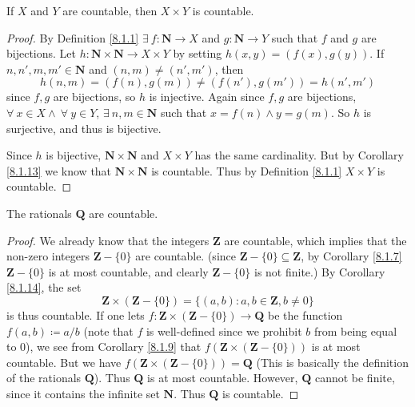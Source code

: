 \begin{corollary}\label{8.1.14}
    If \(X\) and \(Y\) are countable, then \(X \times Y\) is countable.
\end{corollary}

\begin{proof}
    By Definition \ref{8.1.1} \(\exists\ f : \mathbf{N} \to X\) and \(g : \mathbf{N} \to Y\) such that \(f\) and \(g\) are bijections.
    Let \(h : \mathbf{N} \times \mathbf{N} \to X \times Y\) by setting \(h(x, y) = (f(x), g(y))\).
    If \(n, n', m, m' \in \mathbf{N}\) and \((n, m) \neq (n', m')\), then
    \[
        h(n, m) = (f(n), g(m)) \neq (f(n'), g(m')) = h(n', m')
    \]
    since \(f, g\) are bijections, so \(h\) is injective.
    Again since \(f, g\) are bijections, \(\forall\ x \in X \land \ \forall\ y \in Y\), \(\exists\ n, m \in \mathbf{N}\) such that \(x = f(n) \land y = g(m)\).
    So \(h\) is surjective, and thus is bijective.

    Since \(h\) is bijective, \(\mathbf{N} \times \mathbf{N}\) and \(X \times Y\) has the same cardinality.
    But by Corollary \ref{8.1.13} we know that \(\mathbf{N} \times \mathbf{N}\) is countable.
    Thus by Definition \ref{8.1.1} \(X \times Y\) is countable.
\end{proof}

\begin{corollary}\label{8.1.15}
    The rationals \(\mathbf{Q}\) are countable.
\end{corollary}

\begin{proof}
    We already know that the integers \(\mathbf{Z}\) are countable, which implies that the non-zero integers \(\mathbf{Z} - \{0\}\) are countable.
    (since \(\mathbf{Z} - \{0\} \subseteq \mathbf{Z}\), by Corollary \ref{8.1.7} \(\mathbf{Z} - \{0\}\) is at most countable, and clearly \(\mathbf{Z} - \{0\}\) is not finite.)
    By Corollary \ref{8.1.14}, the set
    \[
        \mathbf{Z} \times (\mathbf{Z} - \{0\}) = \{(a, b) : a, b \in \mathbf{Z}, b \neq 0\}
    \]
    is thus countable.
    If one lets \(f : \mathbf{Z} \times (\mathbf{Z} - \{0\}) \to \mathbf{Q}\) be the function \(f(a, b) \coloneqq a / b\)
    (note that \(f\) is well-defined since we prohibit \(b\) from being equal to \(0\)), we see from Corollary \ref{8.1.9} that \(f(\mathbf{Z} \times (\mathbf{Z} - \{0\}))\) is at most countable.
    But we have \(f(\mathbf{Z} \times (\mathbf{Z} - \{0\})) = \mathbf{Q}\)
    (This is basically the definition of the rationals \(\mathbf{Q}\)).
    Thus \(\mathbf{Q}\) is at most countable.
    However, \(\mathbf{Q}\) cannot be finite, since it contains the infinite set \(\mathbf{N}\).
    Thus \(\mathbf{Q}\) is countable.
\end{proof}

